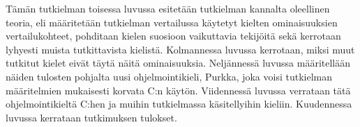
%


Tämän tutkielman toisessa luvussa esitetään tutkielman kannalta oleellinen
teoria, eli määritetään tutkielman vertailussa käytetyt kielten ominaisuuksien
vertailukohteet, pohditaan kielen suosioon vaikuttavia tekijöitä sekä kerrotaan
lyhyesti muista tutkittavista kielistä. Kolmannessa luvussa kerrotaan, miksi
muut tutkitut kielet eivät täytä näitä ominaisuuksia. Neljännessä luvussa
määritellään näiden tulosten pohjalta uusi ohjelmointikieli, Purkka, joka voisi
tutkielman määritelmien mukaisesti korvata C:n käytön. Viidennessä luvussa
verrataan tätä ohjelmointikieltä C:hen ja muihin tutkielmassa käsitellyihin
kieliin. Kuudennessa luvussa kerrataan tutkimuksen tulokset.

